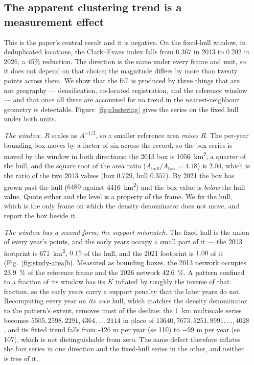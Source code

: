 \documentclass[fleqn,10pt,lineno]{wlpeerj}
\newcommand{\locHullDrop}{45}
\newcommand{\rHullLocFirst}{0.367}
\newcommand{\rHullLocLast}{0.202}
\newcommand{\lKmExact}{-426}
\begin{document}
\subsection*{The apparent clustering trend is a measurement effect}
\label{sec:results-trend}

This is the paper's central result and it is negative. On the fixed-hull window, in
deduplicated locations, the Clark--Evans index falls from \rHullLocFirst{} in 2013 to
\rHullLocLast{} in 2026, a \locHullDrop\% reduction. The direction is the same under every
frame and unit, so it does not depend on that choice; the magnitude differs by more than
twenty points across them. We show that the fall is produced by three things that are not
geography --- densification, co-located registration, and the reference window --- and that once
all three are accounted for no trend in the nearest-neighbour geometry is detectable.
Figure~\ref{fig:clustering} gives the series on the fixed hull under both units.

\noindent\emph{The window.} $R$ scales as $A^{-1/2}$, so a smaller reference area \emph{raises}
$R$. The per-year bounding box moves by a factor of six across the record, so the box series is
moved by the window in both directions: the 2013 box is \SI{1056}{\kilo\meter\squared}, a quarter
of the hull, and the square root of the area ratio ($A_{\text{hull}}/A_{\text{box}} = 4.18$) is
$2.04$, which is the ratio of the two 2013 values (box $0.729$, hull $0.357$). By 2021 the box has
grown past the hull ($6489$ against \SI{4416}{\kilo\meter\squared}) and the box value is
\emph{below} the hull value. Quote either and the level is a property of the frame. We fix the
hull, which is the only frame on which the density denominator does not move, and report the box
beside it.

\noindent\emph{The window has a second form: the support mismatch.} The fixed hull is the union
of every year's points, and the early years occupy a small part of it --- the 2013 footprint is
\SI{671}{\kilo\meter\squared}, $0.15$ of the hull, and the 2021 footprint is $1.00$ of it
(Fig.~\ref{fig:study-area}b). Measured as bounding boxes, the 2013 network occupies
\SI{23.9}{\percent} of the reference frame and the 2026 network \SI{42.6}{\percent}. A
pattern confined to a fraction of its window has its $K$ inflated by roughly the inverse of that
fraction, so the early years carry a support penalty that the later years do not. Recomputing
every year on \emph{its own} hull, which matches the density denominator to the pattern's extent,
removes most of the decline: the \SI{1}{\kilo\meter} multiscale series becomes
$5505, 2598, 2291, 4364, \dots, 2114$ in place of $13640, 7673, 5251, 8991, \dots, 4028$, and its
fitted trend falls from \lKmExact{} m per year (se \num{110}) to \num{-99} m per year
(se \num{107}), which is not distinguishable from zero. The same defect therefore inflates the
box series in one direction and the fixed-hull series in the other, and neither is free of it.
\end{document}
